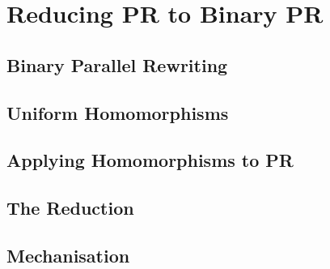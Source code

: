 \chapter{Reducing PR to Binary PR}\label{chap:pr_bpr}

\section{Binary Parallel Rewriting}

\section{Uniform Homomorphisms}

\section{Applying Homomorphisms to PR}

\section{The Reduction}

\section{Mechanisation}

